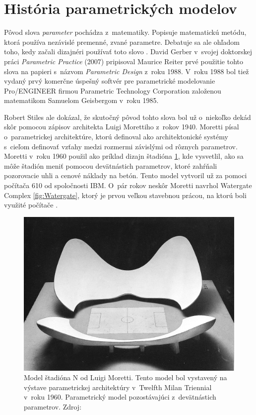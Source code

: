 \section{História parametrických modelov}



Pôvod slova \textit{parameter} pochádza z~matematiky. Popisuje matematickú metódu, ktorá používa nezávislé premenné, zvané parametre. Debatuje sa ale ohľadom toho, kedy začali dizajnéri používať toto slovo \cite{davis_2013}. David Gerber v~svojej doktorskej práci \textit{Parametric Practice} (2007) pripisoval Maurice Reiter prvé použitie tohto slova na papieri s~názvom \textit{Parametric Design} z~roku 1988. V~roku 1988 bol tiež vydaný prvý komerčne úspešný softvér pre parametrické modelovanie \textsf{Pro/ENGINEER} firmou Parametric Technology Corporation založenou matematikom Samuelom Geisbergom v~roku 1985.

Robert Stiles ale dokázal, že skutočný pôvod tohto slova bol už o~niekoľko dekád skôr pomocou zápisov architekta Luigi Morettiho z~rokov 1940.  Moretti písal o~parametrickej architektúre, ktorú definoval ako architektonické systémy s~cieľom 
definovať vzťahy medzi rozmermi závislými od rôznych parametrov.
Moretti v~roku 1960 použil ako príklad dizajn štadióna \ref{fig:morretiStadion}, kde vysvetlil, ako sa môže štadión meniť pomocou devätnástich parametrov, ktoré zahŕňali pozorovacie uhli a cenové náklady na betón. Tento model vytvoril už za pomoci počítača 610 od spoločnosti IBM\cite{doi:10.1002/ad.2019}. O~pár rokov neskôr Moretti navrhol Watergate Complex \ref{fig:Watergate}, ktorý je prvou veľkou stavebnou prácou, na ktorú boli využité počítače \cite{davis_2013}. 


\begin{figure}[H]
    \centering
    \includegraphics[width = \linewidth]{obrazky-figures/moretti_1.jpg}
    \caption{Model štadióna N od Luigi Moretti. Tento model bol vystavený na výstave parametrickej architektúry v~Twelfth Milan Triennial v~roku 1960. Parametrický model pozostávajúci z~devätnástich parametrov. Zdroj:  \cite{davis_2013}}
    \label{fig:morretiStadion}
\end{figure}

